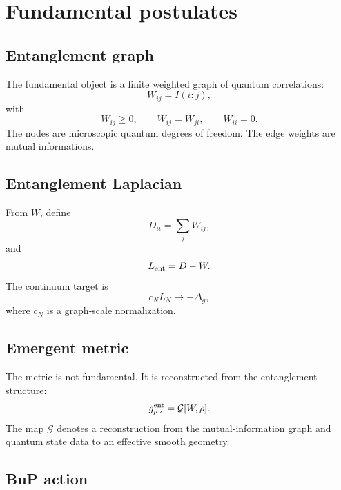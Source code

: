 \documentclass[11pt,a4paper]{article}
\begin{document}
\section{Fundamental postulates}

\subsection{Entanglement graph}

The fundamental object is a finite weighted graph of quantum correlations:
\begin{equation}
  W_{ij}=I(i:j),
\end{equation}
with
\begin{equation}
  W_{ij}\ge 0,\qquad
  W_{ij}=W_{ji},\qquad
  W_{ii}=0.
\end{equation}
The nodes are microscopic quantum degrees of freedom. The edge weights are
mutual informations.

\subsection{Entanglement Laplacian}

From \(W\), define
\begin{equation}
  D_{ii}=\sum_j W_{ij},
\end{equation}
and
\begin{equation}
  L_{\rm ent}=D-W.
\end{equation}
The continuum target is
\begin{equation}
  c_N L_N\to-\Delta_g,
  \label{eq:laplacian_target}
\end{equation}
where \(c_N\) is a graph-scale normalization.

\subsection{Emergent metric}

The metric is not fundamental. It is reconstructed from the entanglement
structure:
\begin{equation}
  g_{\mu\nu}^{\rm ent}=\mathcal G[W,\rho].
\end{equation}
The map \(\mathcal G\) denotes a reconstruction from the mutual-information
graph and quantum state data to an effective smooth geometry.

\subsection{BuP action}
\end{document}
